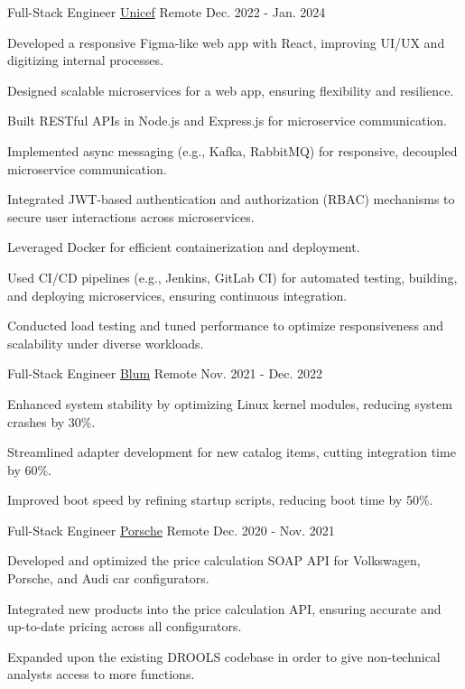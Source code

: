 \begin{cventries}
  \cventry
    {Full-Stack Engineer} %
    {\href{https://unicef.org}{Unicef}} %
    {Remote} %
    {Dec. 2022 - Jan. 2024} %
    {
      \begin{cvitems} %
        \item {Developed a responsive Figma-like web app with React, improving UI/UX and digitizing internal processes.}
        \item {Designed scalable microservices for a web app, ensuring flexibility and resilience.}
        \item {Built RESTful APIs in Node.js and Express.js for microservice communication.}
        \item {Implemented async messaging (e.g., Kafka, RabbitMQ) for responsive, decoupled microservice communication.}
        \item {Integrated JWT-based authentication and authorization (RBAC) mechanisms to secure user interactions across microservices.}
        \item {Leveraged Docker for efficient containerization and deployment.}
        \item {Used CI/CD pipelines (e.g., Jenkins, GitLab CI) for automated testing, building, and deploying microservices, ensuring continuous integration.}
        \item {Conducted load testing and tuned performance to optimize responsiveness and scalability under diverse workloads.}
      \end{cvitems}
    }

  \cventry
    {Full-Stack Engineer} %
    {\href{https://blum.com}{Blum}} %
    {Remote} %
    {Nov. 2021 - Dec. 2022} %
    {
      \begin{cvitems} %
        \item {Enhanced system stability by optimizing Linux kernel modules, reducing system crashes by 30\%.}
        \item {Streamlined adapter development for new catalog items, cutting integration time by 60\%.}
        \item {Improved boot speed by refining startup scripts, reducing boot time by 50\%.}
      \end{cvitems}
    }

  \cventry
    {Full-Stack Engineer} %
    {\href{https://www.porscheengineering.com}{Porsche}} %
    {Remote} %
    {Dec. 2020 - Nov. 2021} %
    {
      \begin{cvitems} %
        \item {Developed and optimized the price calculation SOAP API for Volkswagen, Porsche, and Audi car configurators.}
        \item {Integrated new products into the price calculation API, ensuring accurate and up-to-date pricing across all configurators.}
        \item {Expanded upon the existing DROOLS codebase in order to give non-technical analysts access to more functions.}
      \end{cvitems}
    }


\end{cventries}

